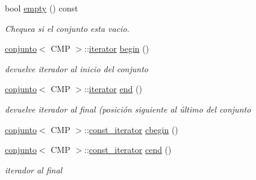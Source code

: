 \begin{DoxyCompactItemize}
bool \hyperlink{classconjunto_a904716d6ae739f0461880b08138cf4e4}{empty} () const 
\begin{DoxyCompactList}\small\item\em Chequea si el conjunto esta vacio. \end{DoxyCompactList}\item 
\hypertarget{classconjunto_a9747d18cc29695c016b79cbf65d5ea7f}{\hyperlink{classconjunto}{conjunto}$<$ C\-M\-P $>$\-::\hyperlink{classconjunto_1_1iterator}{iterator} \hyperlink{classconjunto_a9747d18cc29695c016b79cbf65d5ea7f}{begin} ()}\label{classconjunto_a9747d18cc29695c016b79cbf65d5ea7f}

\begin{DoxyCompactList}\small\item\em devuelve iterador al inicio del conjunto \end{DoxyCompactList}\item 
\hypertarget{classconjunto_ab9be89e672032da4f0945663c76e9f1b}{\hyperlink{classconjunto}{conjunto}$<$ C\-M\-P $>$\-::\hyperlink{classconjunto_1_1iterator}{iterator} \hyperlink{classconjunto_ab9be89e672032da4f0945663c76e9f1b}{end} ()}\label{classconjunto_ab9be89e672032da4f0945663c76e9f1b}

\begin{DoxyCompactList}\small\item\em devuelve iterador al final (posición siguiente al último del conjunto \end{DoxyCompactList}\item 
\hyperlink{classconjunto}{conjunto}$<$ C\-M\-P $>$\-::\hyperlink{classconjunto_1_1const__iterator}{const\-\_\-iterator} \hyperlink{classconjunto_a6e8833cb56442734093687ae1d28d102}{cbegin} ()
\item 
\hyperlink{classconjunto}{conjunto}$<$ C\-M\-P $>$\-::\hyperlink{classconjunto_1_1const__iterator}{const\-\_\-iterator} \hyperlink{classconjunto_afec117e159e5ad48e7688962bba92daa}{cend} ()
\begin{DoxyCompactList}\small\item\em iterador al final \end{DoxyCompactList}\end{DoxyCompactItemize}
